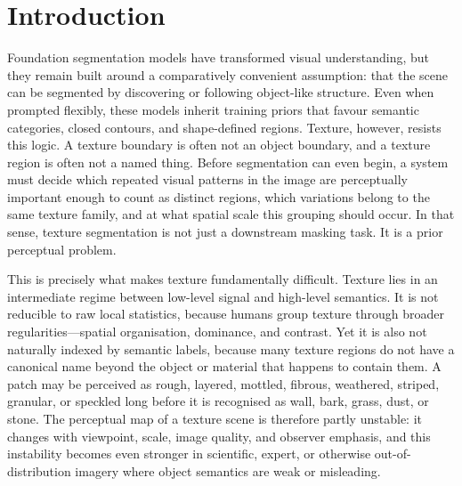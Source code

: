 \documentclass{article}
\begin{document}
\begin{abstract}
${\sim}8.2$M trainable parameters on top of frozen Qwen3-VL-8B and SAM~3 backbones. We further contribute the \textbf{Detecture Miner}, a geometry-first texture mining framework, and adapt the \textbf{Real-World Texture Dataset (RWTD)} for VLM-guided evaluation.
\end{abstract}

\section{Introduction}

Foundation segmentation models have transformed visual understanding, but they remain built around a comparatively convenient assumption: that the scene can be segmented by discovering or following object-like structure. Even when prompted flexibly, these models inherit training priors that favour semantic categories, closed contours, and shape-defined regions. Texture, however, resists this logic. A texture boundary is often not an object boundary, and a texture region is often not a named thing. Before segmentation can even begin, a system must decide which repeated visual patterns in the image are perceptually important enough to count as distinct regions, which variations belong to the same texture family, and at what spatial scale this grouping should occur. In that sense, texture segmentation is not just a downstream masking task. It is a prior perceptual problem.

This is precisely what makes texture fundamentally difficult. Texture lies in an intermediate regime between low-level signal and high-level semantics. It is not reducible to raw local statistics, because humans group texture through broader regularities---spatial organisation, dominance, and contrast. Yet it is also not naturally indexed by semantic labels, because many texture regions do not have a canonical name beyond the object or material that happens to contain them. A patch may be perceived as rough, layered, mottled, fibrous, weathered, striped, granular, or speckled long before it is recognised as wall, bark, grass, dust, or stone. The perceptual map of a texture scene is therefore partly unstable: it changes with viewpoint, scale, image quality, and observer emphasis, and this instability becomes even stronger in scientific, expert, or otherwise out-of-distribution imagery where object semantics are weak or misleading.
\end{document}

